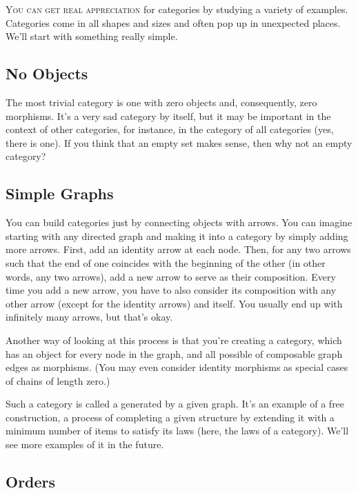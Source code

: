 \lettrine[lhang=0.17]{Y}{ou can get real appreciation} for categories by studying a variety of
examples. Categories come in all shapes and sizes and often pop up in
unexpected places. We'll start with something really simple.

\subsection{No Objects}\label{no-objects}

The most trivial category is one with zero objects and, consequently,
zero morphisms. It's a very sad category by itself, but it may be
important in the context of other categories, for instance, in the
category of all categories (yes, there is one). If you think that an
empty set makes sense, then why not an empty category?

\subsection{Simple Graphs}\label{simple-graphs}

You can build categories just by connecting objects with arrows. You can
imagine starting with any directed graph and making it into a category
by simply adding more arrows. First, add an identity arrow at each node.
Then, for any two arrows such that the end of one coincides with the
beginning of the other (in other words, any two 
arrows), add a new arrow to serve as their composition. Every time you
add a new arrow, you have to also consider its composition with any
other arrow (except for the identity arrows) and itself. You usually end
up with infinitely many arrows, but that's okay.

Another way of looking at this process is that you're creating a
category, which has an object for every node in the graph, and all
possible  of composable graph edges as morphisms. (You may
even consider identity morphisms as special cases of chains of length
zero.)

Such a category is called a  generated by a given
graph. It's an example of a free construction, a process of completing a
given structure by extending it with a minimum number of items to
satisfy its laws (here, the laws of a category). We'll see more examples
of it in the future.

\subsection{Orders}\label{orders}

